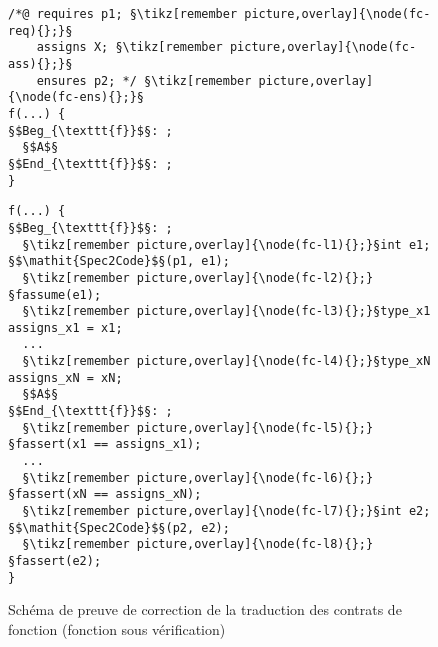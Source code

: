 \begin{figure}[bt]
  \begin{minipage}{0.65\textwidth}
    \begin{lstlisting}[escapechar=§]
/*@ requires p1; §\tikz[remember picture,overlay]{\node(fc-req){};}§
    assigns X; §\tikz[remember picture,overlay]{\node(fc-ass){};}§
    ensures p2; */ §\tikz[remember picture,overlay]{\node(fc-ens){};}§
f(...) {
§$Beg_{\texttt{f}}$§: ;
  §$A$§
§$End_{\texttt{f}}$§: ;
}
    \end{lstlisting}
  \end{minipage}\hfill
  \begin{minipage}{0.49\textwidth}
    \begin{lstlisting}[escapechar=§]
f(...) {
§$Beg_{\texttt{f}}$§: ;
  §\tikz[remember picture,overlay]{\node(fc-l1){};}§int e1; §$\mathit{Spec2Code}$§(p1, e1);
  §\tikz[remember picture,overlay]{\node(fc-l2){};}§fassume(e1);
  §\tikz[remember picture,overlay]{\node(fc-l3){};}§type_x1 assigns_x1 = x1;
  ...
  §\tikz[remember picture,overlay]{\node(fc-l4){};}§type_xN assigns_xN = xN;
  §$A$§
§$End_{\texttt{f}}$§: ;
  §\tikz[remember picture,overlay]{\node(fc-l5){};}§fassert(x1 == assigns_x1);
  ...
  §\tikz[remember picture,overlay]{\node(fc-l6){};}§fassert(xN == assigns_xN);
  §\tikz[remember picture,overlay]{\node(fc-l7){};}§int e2; §$\mathit{Spec2Code}$§(p2, e2);
  §\tikz[remember picture,overlay]{\node(fc-l8){};}§fassert(e2);
}
    \end{lstlisting}
  \end{minipage}
  \caption{Schéma de preuve de correction de la traduction des contrats de
    fonction (fonction sous vérification)}
  \label{fig:proof-fct-contract-main}
\end{figure}
